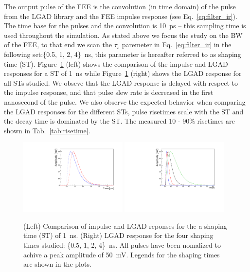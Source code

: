 \documentclass[preprint,1p]{elsarticle}
\begin{document}
 The output pulse of the FEE is the convolution (in time domain) of the pulse from the LGAD library and the FEE impulse response
 (see Eq.~\ref{eq:filter_ir}).
 The time base for the pulses and the convolution is 10~\si{ps} -- this sampling time is used throughout the simulation. As stated above we focus the study
 on the BW of the FEE, to that end we scan the $\tau_{s}$ paremeter in Eq.~\ref{eq:filter_ir} in the following set:\{0.5, 1, 2, 4\}~\si{ns}, this parameter is hereafter referred to as
 shaping time (ST). Figure~\ref{fig:ir_and_lgad} (left) shows the comparison of the impulse and LGAD responses for a ST of 1~\si{ns} while
 Figure~\ref{fig:ir_and_lgad} (right) shows the LGAD response for all STs studied. We obseve that the LGAD response is delayed with respect
 to the impulse response,  and that pulse slew rate is decreased in the first nanosecond of the pulse. We also observe the expected
 behavior when comparing the LGAD responses for the different STs, pulse risetimes scale with the ST and the decay time is dominated by
 the ST. The measured 10 - 90\% risetimes are shown in Tab.~\ref{tab:risetime}.


\begin{figure}[htbp]
  \centering
  \includegraphics[width=0.48\textwidth]{figs/impulse_vs_lgad_response_1ens_shaping.pdf} \hfill
  \includegraphics[width=0.48\textwidth]{figs/lgad_all_shaping_time_noiseless.pdf}
  \caption{(Left) Comparison of impulse and LGAD reponses for the a shaping time (ST) of 1~\si{ns}.
  (Right) LGAD response for the four shaping times studied: \{0.5, 1, 2, 4\}~\si{ns}. All pulses have been nomalized
  to achive a peak amplitude of 50~\si{mV}. Legends for the shaping times are shown in the plots.}
  \label{fig:ir_and_lgad}
\end{figure}
\end{document}
